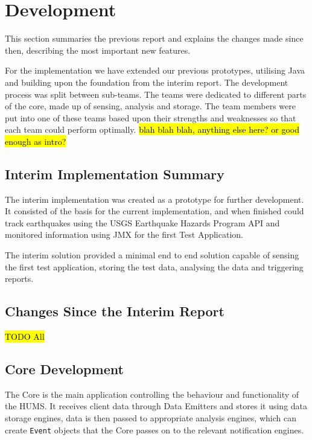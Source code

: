 \documentclass[10pt,a4paper]{article}
\begin{document}
\section{Development}
\label{sec:dev}
This section summaries the previous report and explains the changes made since then, describing the most important new features. 

For the implementation we have extended our previous prototypes, utilising Java and building upon the foundation from the interim report. The development process was split between sub-teams. The teams were dedicated to different parts of the core, made up of sensing, analysis and storage. The team members were put into one of these teams based upon their strengths and weaknesses so that each team could perform optimally. \hl{blah blah blah, anything else here? or good enough as intro?}

\subsection{Interim Implementation Summary}
\label{sec:interim_summary}
The interim implementation was created as a prototype for further development. It consisted of the basis for the current implementation, and when finished could track earthquakes using the USGS Earthquake Hazards Program API and monitored information using JMX for the first Test Application.

The interim solution provided a minimal end to end solution capable of sensing the first test application, storing the test data, analysing the data and triggering reports. 

\subsection{Changes Since the Interim Report}
\label{sec:changes}
\hl{TODO All}

\subsection{Core Development}
\label{sec:core}
 
The Core is the main application controlling the behaviour and functionality of the HUMS. It receives client data through Data Emitters and stores it using data storage engines, data is then passed to appropriate analysis engines, which can create \texttt{Event} objects that the Core passes on to the relevant notification engines.
\end{document}
